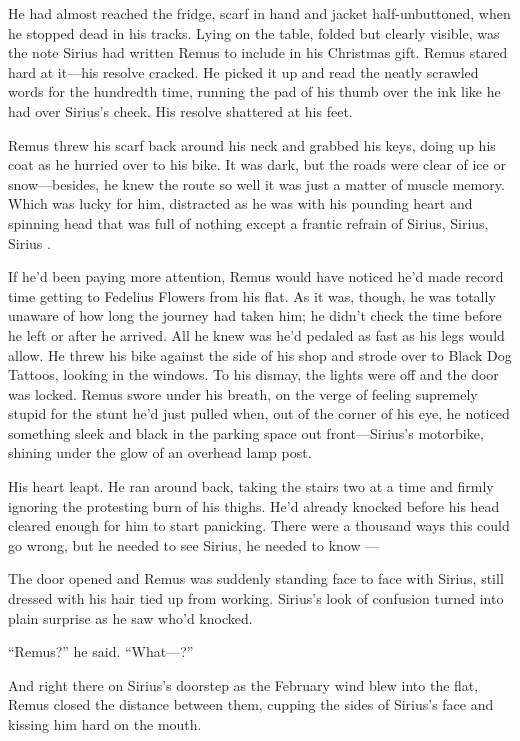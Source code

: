 He had almost reached the fridge, scarf in hand and jacket half-unbuttoned, when he stopped dead in his tracks. Lying on the table, folded but clearly visible, was the note Sirius had written Remus to include in his Christmas gift. Remus stared hard at it—his resolve cracked. He picked it up and read the neatly scrawled words for the hundredth time, running the pad of his thumb over the ink like he had over Sirius’s cheek. His resolve shattered at his feet.

Remus threw his scarf back around his neck and grabbed his keys, doing up his coat as he hurried over to his bike. It was dark, but the roads were clear of ice or snow—besides, he knew the route so well it was just a matter of muscle memory. Which was lucky for him, distracted as he was with his pounding heart and spinning head that was full of nothing except a frantic refrain of Sirius, Sirius, Sirius .

If he’d been paying more attention, Remus would have noticed he’d made record time getting to Fedelius Flowers from his flat. As it was, though, he was totally unaware of how long the journey had taken him; he didn’t check the time before he left or after he arrived. All he knew was he’d pedaled as fast as his legs would allow. He threw his bike against the side of his shop and strode over to Black Dog Tattoos, looking in the windows. To his dismay, the lights were off and the door was locked. Remus swore under his breath, on the verge of feeling supremely stupid for the stunt he’d just pulled when, out of the corner of his eye, he noticed something sleek and black in the parking space out front—Sirius’s motorbike, shining under the glow of an overhead lamp post.

His heart leapt. He ran around back, taking the stairs two at a time and firmly ignoring the protesting burn of his thighs. He’d already knocked before his head cleared enough for him to start panicking. There were a thousand ways this could go wrong, but he needed to see Sirius, he needed to know —

The door opened and Remus was suddenly standing face to face with Sirius, still dressed with his hair tied up from working. Sirius’s look of confusion turned into plain surprise as he saw who’d knocked.

“Remus?” he said. “What—?”

And right there on Sirius’s doorstep as the February wind blew into the flat, Remus closed the distance between them, cupping the sides of Sirius’s face and kissing him hard on the mouth.

